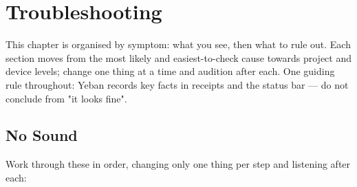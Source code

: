 
\chapter{Troubleshooting}
\label{ch:troubleshooting}






This chapter is organised by symptom: what you see, then what to rule out. Each section
moves from the most likely and easiest-to-check cause towards project and device levels;
change one thing at a time and audition after each. One guiding rule throughout: Yeban
records key facts in receipts and the status bar — do not conclude from "it looks fine".

\section{No Sound}

Work through these in order, changing only one thing per step and listening after each:


